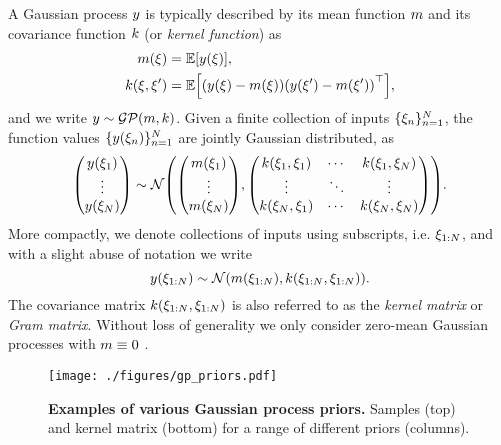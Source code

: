 \documentclass{mimosis}
\begin{document}
A Gaussian process \(y\) is typically described by its mean function \(m\) and its covariance function \(k\) (or \emph{kernel function}) as
\begin{subequations}
\begin{align}
\gpmeanfun(\xi) &= \mathbb{E}\left[ \sval(\xi) \right], \\
\gpcovfun(\xi, \xi') &= \mathbb{E}\left[
    \left(\sval(\xi) - \gpmeanfun(\xi)\right)
    \left(\sval(\xi') - \gpmeanfun(\xi')\right)^\T
  \right],
\end{align}
\end{subequations}
and we write \(\sval \sim \GP( \gpmeanfun, \gpcovfun )\).
Given a finite collection of inputs \(\{\xi_n\}_{n=1}^N\), the function values \(\{y(\xi_n)\}_{n=1}^N\) are jointly Gaussian distributed, as
\begin{equation}
\mqty(\sval(\xi_1) \\ \vdots \\ \sval(\xi_\idxtmax))
\sim \N(\mqty(\gpmeanfun(\xi_1) \\ \vdots \\ \gpmeanfun(\xi_\idxtmax)),
      \mqty(
        \gpcovfun(\xi_1, \xi_1) & \cdots & \gpcovfun(\xi_1, \xi_\idxtmax) \\
        \vdots & \ddots & \vdots \\
        \gpcovfun(\xi_\idxtmax, \xi_1) & \cdots & \gpcovfun(\xi_\idxtmax, \xi_\idxtmax)
      )).
\end{equation}
More compactly, we denote collections of inputs using subscripts, i.e. \(\xi_{1:N}\), and with a slight abuse of notation we write
\begin{equation}
\sval(\xi_{1:\idxtmax}) \sim \N( \gpmeanfun(\xi_{1:\idxtmax}), \gpcovfun(\xi_{1:\idxtmax}, \xi_{1:\idxtmax}) ).
\end{equation}
The covariance matrix \(k(\xi_{1:N}, \xi_{1:N})\) is also referred to as the \emph{kernel matrix} or \emph{Gram matrix}.
Without loss of generality we only consider zero-mean Gaussian processes with \(m \equiv 0\)
\parencite{rasmussen2005gpml}.

\begin{figure}[t]
\centering
\texttt{[image: ./figures/gp\_priors.pdf]}
\caption{\label{fig:gp_priors}\textbf{Examples of various Gaussian process priors.} Samples (top) and kernel matrix (bottom) for a range of different priors (columns).}
\end{figure}
\end{document}
